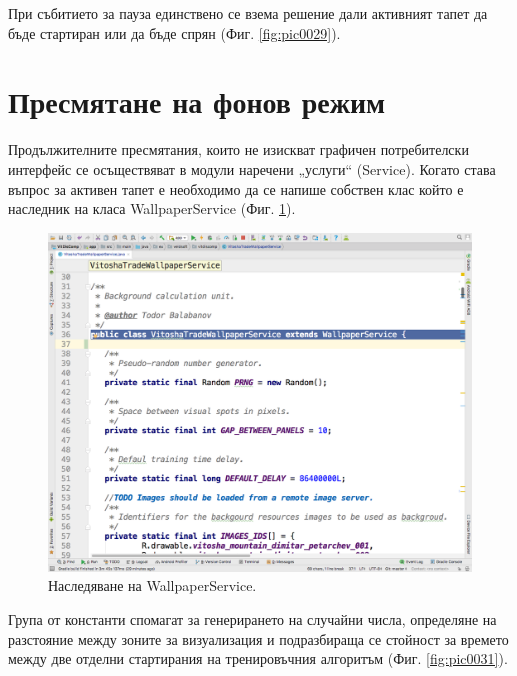 \documentclass[book,14pt,oneside,openany]{memoir}
\begin{document}
При събитието за пауза единствено се взема решение дали активният тапет да бъде стартиран или да бъде спрян (Фиг. \ref{fig:pic0029}). 

\section{Пресмятане на фонов режим}

Продължителните пресмятания, които не изискват графичен потребителски интерфейс се осъществяват в модули наречени „услуги“ (Service). Когато става въпрос за активен тапет е необходимо да се напише собствен клас който е наследник на класа WallpaperService (Фиг. \ref{fig:pic0030}).

\begin{figure}[h]
  \centering
  \includegraphics[height=0.45\pdfpageheight]{pic0030}
  \caption{Наследяване на WallpaperService.}
\label{fig:pic0030}
\end{figure}
\FloatBarrier

Група от константи спомагат за генерирането на случайни числа, определяне на разстояние между зоните за визуализация и подразбираща се стойност за времето между две отделни стартирания на тренировъчния алгоритъм (Фиг. \ref{fig:pic0031}). 
\end{document}
